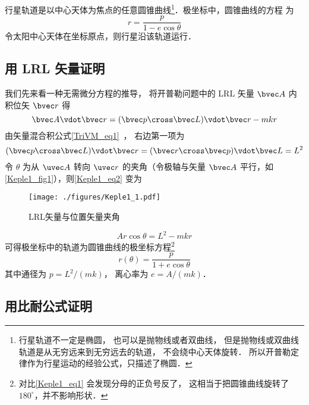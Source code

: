 

行星轨道是以中心天体为焦点的任意圆锥曲线\footnote{行星轨道不一定是椭圆， 也可以是抛物线或者双曲线， 但是抛物线或双曲线轨道是从无穷远来到无穷远去的轨道， 不会绕中心天体旋转． 所以开普勒定律作为行星运动的经验公式，只描述了椭圆．}．极坐标中，圆锥曲线的方程
为
\begin{equation}\label{Keple1_eq1}
r = \frac{p}{1 - e \cos \theta }
\end{equation}
令太阳中心天体在坐标原点，则行星沿该轨道运行．

\subsection{用 LRL 矢量证明}

我们先来看一种无需微分方程的推导， 将开普勒问题中的 LRL 矢量 $\bvec A$ 内积位矢 $\bvec r$ 得
\begin{equation}\label{Keple1_eq2}
\bvec A \vdot \bvec r = (\bvec p \cross \bvec L)\vdot \bvec r - mkr
\end{equation}
由矢量混合积公式\autoref{TriVM_eq1}~， 右边第一项为
\begin{equation}
(\bvec p \cross \bvec L)\vdot \bvec r = (\bvec r \cross \bvec p)\vdot \bvec L = L^2
\end{equation}
令 $\theta$ 为从 $\uvec A$ 转向 $\uvec r$ 的夹角（令极轴与矢量 $\bvec A$ 平行，如\autoref{Keple1_fig1}），则\autoref{Keple1_eq2} 变为
\begin{figure}[ht]
\centering
\texttt{[image: ./figures/Keple1\_1.pdf]}
\caption{LRL矢量与位置矢量夹角} \label{Keple1_fig1}
\end{figure}
\begin{equation}
Ar\cos\theta = L^2 - mkr
\end{equation}
可得极坐标中的轨道为圆锥曲线的极坐标方程\footnote{对比\autoref{Keple1_eq1} 会发现分母的正负号反了， 这相当于把圆锥曲线旋转了 $180^\circ$，并不影响形状．}
\begin{equation}
r(\theta) = \frac{p}{1 + e\cos\theta}
\end{equation}
其中通径为 $p = L^2/(mk)$， 离心率为 $e = A/(mk)$．

\subsection{用比耐公式证明}

